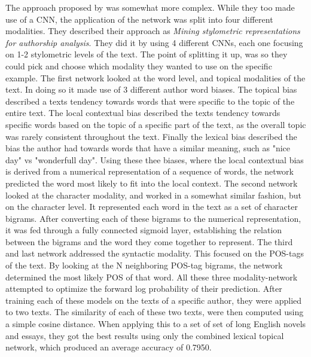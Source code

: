 The approach proposed by \citet{ding2016} was somewhat more complex. While they
too made use of a \gls{CNN}, the application of the network was split into
four different modalities. They described their approach as \textit{Mining
stylometric representations for authorship analysis}. They did it by using
4 different \glspl{CNN}, each one focusing on 1-2 stylometric levels of the
text. The point of splitting it up, was so they could pick and choose which
modality they wanted to use on the specific example. The first network looked
at the word level, and topical modalities of the text. In doing so it made use
of 3 different author word biases. The topical bias described a texts tendency
towards words that were specific to the topic of the entire text. The local
contextual bias described the texts tendency towards specific words based on
the topic of a specific part of the text, as the overall topic was rarely
consistent throughout the text. Finally the lexical bias described the bias
the author had towards words that have a similar meaning, such as "nice day"
vs "wonderfull day". Using these thee biases, where the local contextual bias
is derived from a numerical representation of a sequence of words, the network
predicted the word most likely to fit into the local context. The second network
looked at the character modality, and worked in a somewhat similar fashion,
but on the character level. It represented each word in the text as a set of
character bigrams. After converting each of these bigrams to the numerical
representation, it was fed through a fully connected sigmoid layer, establishing
the relation between the bigrams and the word they come together to represent.
The third and last network addressed the syntactic modality. This focused on
the \gls{POS}-tags of the text. By looking at the N neighboring \gls{POS}-tag
bigrams, the network determined the most likely \gls{POS} of that word. All
these three modality-network attempted to optimize the forward log probability
of their prediction. After training each of these models on the texts of a
specific author, they were applied to two texts. The similarity of each of these
two texts, were then computed using a simple cosine distance. When applying this
to a set of set of long English novels and essays, they got the best results
using only the combined lexical topical network, which produced an average
accuracy of 0.7950.

